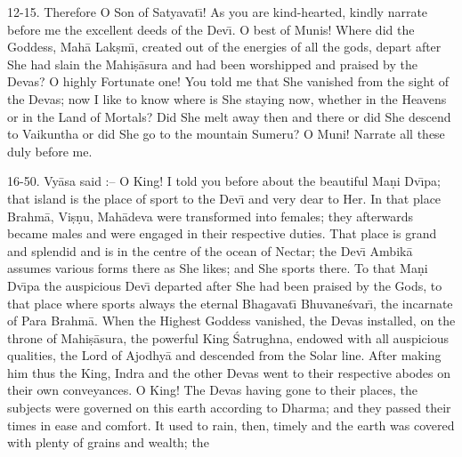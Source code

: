 12-15. Therefore O Son of Satyavat\={\i}! As you are kind-hearted, kindly narrate before me the excellent deeds of the Dev\={\i}. O best of Munis! Where did the Goddess, Mah\=a Lak\d{s}m\={\i}, created out of the energies of all the gods, depart after She had slain the Mahi\d{s}\=asura and had been worshipped and praised by the Devas? O highly Fortunate one! You told me that She vanished from the sight of the Devas; now I like to know where is She staying now, whether in the Heavens or in the Land of Mortals? Did She melt away then and there or did She descend to Vaikuntha or did She go to the mountain Sumeru? O Muni! Narrate all these duly before me.

16-50. Vy\=asa said :-- O King! I told you before about the beautiful Ma\d{n}i Dv\={\i}pa; that island is the place of sport to the Dev\={\i} and very dear to Her. In that place Brahm\=a, Vi\d{s}\d{n}u, Mah\=adeva were transformed into females; they afterwards became males and were engaged in their respective duties. That place is grand and splendid and is in the centre of the ocean of Nectar; the Dev\={\i} Ambik\=a assumes various forms there as She likes; and She sports there. To that Ma\d{n}i Dv\={\i}pa the auspicious Dev\={\i} departed after She had been praised by the Gods, to that place where sports always the eternal Bhagavat\={\i} Bhuvane\'svar\={\i}, the incarnate of Para Brahm\=a. When the Highest Goddess vanished, the Devas installed, on the throne of Mahi\d{s}\=asura, the powerful King \'Satrughna, endowed with all auspicious qualities, the Lord of Ajodhy\=a and descended from the Solar line. After making him thus the King, Indra and the other Devas went to their respective abodes on their own conveyances. O King! The Devas having gone to their places, the subjects were governed on this earth according to Dharma; and they passed their times in ease and comfort. It used to rain, then, timely and the earth was covered with plenty of grains and wealth; the

